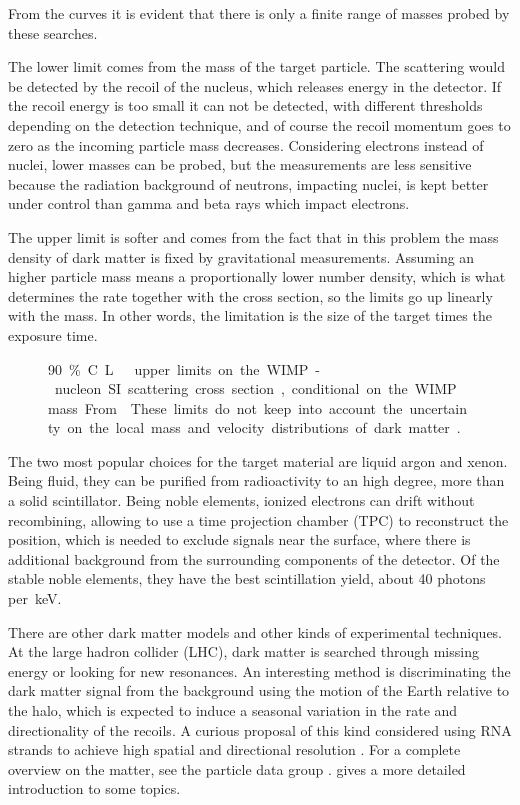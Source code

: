 From the curves it is evident that there is only a finite range of masses
probed by these searches.

The lower limit comes from the mass of the target particle. The scattering
would be detected by the recoil of the nucleus, which releases energy in the
detector. If the recoil energy is too small it can not be detected, with
different thresholds depending on the detection technique, and of course the
recoil momentum goes to zero as the incoming particle mass decreases.
Considering electrons instead of nuclei, lower masses can be probed, but the
measurements are less sensitive because the radiation background of neutrons,
impacting nuclei, is kept better under control than gamma and beta rays which
impact electrons.

The upper limit is softer and comes from the fact that in this problem the mass
density of dark matter is fixed by gravitational measurements. Assuming an
higher particle mass means a proportionally lower number density, which is what
determines the rate together with the cross section, so the limits go up
linearly with the mass. In other words, the limitation is the size of the
target times the exposure time.

\begin{figure}
    
    
    \caption{\label{fig:sigmalimits} \SI{90}\% C.L.\ upper limits on the
    WIMP-nucleon SI scattering cross section, conditional on the WIMP mass.
    From \cite[fig.~27.1 p.~481]{zyla2020}. These limits do not keep into
    account the uncertainty on the local mass and velocity distributions of
    dark matter \cite[sec.~3.1]{baxter2021}.}
    
\end{figure}

The two most popular choices for the target material are liquid argon and
xenon. Being fluid, they can be purified from radioactivity to an high degree,
more than a solid scintillator. Being noble elements, ionized electrons can
drift without recombining, allowing to use a time projection chamber (TPC) to
reconstruct the position, which is needed to exclude signals near the surface,
where there is additional background from the surrounding components of the
detector. Of the stable noble elements, they have the best scintillation yield,
about 40 photons per~\si{keV}.

There are other dark matter models and other kinds of experimental techniques.
At the large hadron collider (LHC), dark matter is searched through missing
energy or looking for new resonances. An interesting method is discriminating
the dark matter signal from the background using the motion of the Earth
relative to the halo, which is expected to induce a seasonal variation in the
rate and directionality of the recoils. A curious proposal of this kind
considered using RNA strands to achieve high spatial and directional resolution
\cite{drukier2015}. For a complete overview on the matter, see the particle
data group \cite[sec.~27]{zyla2020}. \cite[ch.~1]{savarese2018} gives a more
detailed introduction to some topics.
